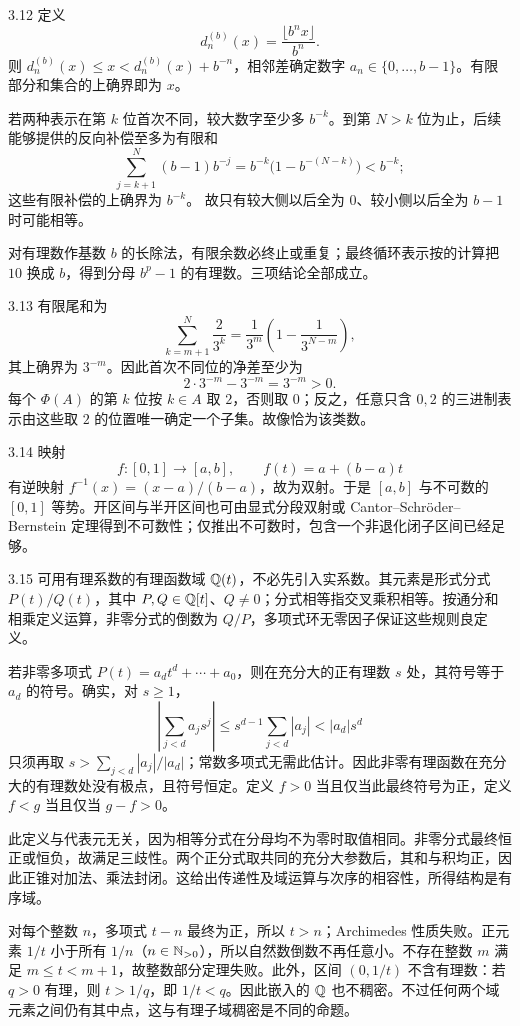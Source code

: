 \begin{solution}{3.12}
定义
\[
 d_n^{(b)}(x)=\frac{\lfloor b^nx\rfloor}{b^n}.
\]
则 \(d_n^{(b)}(x)\le x<d_n^{(b)}(x)+b^{-n}\)，相邻差确定数字 \(a_n\in\{0,\ldots,b-1\}\)。有限部分和集合的上确界即为 \(x\)。

若两种表示在第 \(k\) 位首次不同，较大数字至少多 \(b^{-k}\)。到第 \(N>k\) 位为止，后续能够提供的反向补偿至多为有限和
\[
 \sum_{j=k+1}^{N}(b-1)b^{-j}
 =b^{-k}\bigl(1-b^{-(N-k)}\bigr)<b^{-k};
\]
这些有限补偿的上确界为 \(b^{-k}\)。
故只有较大侧以后全为 \(0\)、较小侧以后全为 \(b-1\) 时可能相等。

对有理数作基数 \(b\) 的长除法，有限余数必终止或重复；最终循环表示按的计算把 \(10\) 换成 \(b\)，得到分母 \(b^p-1\) 的有理数。三项结论全部成立。
\end{solution}

\begin{solution}{3.13}
有限尾和为
\[
 \sum_{k=m+1}^{N}\frac2{3^k}
 =\frac1{3^m}\left(1-\frac1{3^{N-m}}\right),
\]
其上确界为 \(3^{-m}\)。因此首次不同位的净差至少为
\[
 2\cdot3^{-m}-3^{-m}=3^{-m}>0.
\]
每个 \(\Phi(A)\) 的第 \(k\) 位按 \(k\in A\) 取 \(2\)，否则取 \(0\)；反之，任意只含 \(0,2\) 的三进制表示由这些取 \(2\) 的位置唯一确定一个子集。故像恰为该类数。
\end{solution}

\begin{solution}{3.14}
映射
\[
 f:[0,1]\to[a,b],\qquad f(t)=a+(b-a)t
\]
有逆映射 \(f^{-1}(x)=(x-a)/(b-a)\)，故为双射。于是 \([a,b]\) 与不可数的 \([0,1]\) 等势。开区间与半开区间也可由显式分段双射或 Cantor--Schröder--Bernstein 定理得到不可数性；仅推出不可数时，包含一个非退化闭子区间已经足够。
\end{solution}

\begin{solution}{3.15}
可用有理系数的有理函数域 \(\mathbb{Q}(t)\)，不必先引入实系数。其元素是形式分式 \(P(t)/Q(t)\)，其中 \(P,Q\in\mathbb{Q}[t]\)、\(Q\ne0\)；分式相等指交叉乘积相等。按通分和相乘定义运算，非零分式的倒数为 \(Q/P\)，多项式环无零因子保证这些规则良定义。

若非零多项式 \(P(t)=a_dt^d+\cdots+a_0\)，则在充分大的正有理数 \(s\) 处，其符号等于 \(a_d\) 的符号。确实，对 \(s\ge1\)，
\[
 \left|\sum_{j<d}a_js^j\right|
 \le s^{d-1}\sum_{j<d}|a_j|<|a_d|s^d
\]
只须再取 \(s>\sum_{j<d}|a_j|/|a_d|\)；常数多项式无需此估计。因此非零有理函数在充分大的有理数处没有极点，且符号恒定。定义 \(f>0\) 当且仅当此最终符号为正，定义 \(f<g\) 当且仅当 \(g-f>0\)。

此定义与代表元无关，因为相等分式在分母均不为零时取值相同。非零分式最终恒正或恒负，故满足三歧性。两个正分式取共同的充分大参数后，其和与积均正，因此正锥对加法、乘法封闭。这给出传递性及域运算与次序的相容性，所得结构是有序域。

对每个整数 \(n\)，多项式 \(t-n\) 最终为正，所以 \(t>n\)；Archimedes 性质失败。正元素 \(1/t\) 小于所有 \(1/n\)（\(n\in\mathbb{N}_{>0}\)），所以自然数倒数不再任意小。不存在整数 \(m\) 满足 \(m\le t<m+1\)，故整数部分定理失败。此外，区间 \((0,1/t)\) 不含有理数：若 \(q>0\) 有理，则 \(t>1/q\)，即 \(1/t<q\)。因此嵌入的 \(\mathbb{Q}\) 也不稠密。不过任何两个域元素之间仍有其中点，这与有理子域稠密是不同的命题。
\end{solution}

